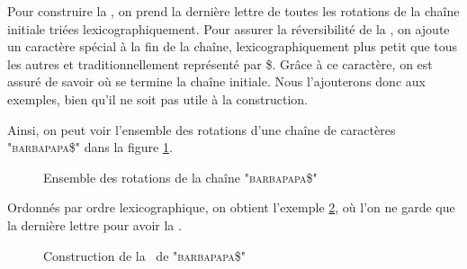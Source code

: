 Pour construire la \bwt, on prend la dernière lettre de toutes les rotations de la chaîne initiale triées lexicographiquement.
Pour assurer la réversibilité de la \bwt, on ajoute un caractère spécial à la fin de la chaîne, lexicographiquement plus petit que tous les autres et traditionnellement représenté par \$. Grâce à ce caractère, on est assuré de savoir où se termine la chaîne initiale. Nous l'ajouterons donc aux exemples, bien qu'il ne soit pas utile à la construction.

Ainsi, on peut voir l'ensemble des rotations d'une chaîne de caractères "\textsc{barbapapa\$}" dans la figure \ref{rotations}.

\begin{figure}[h!]
\caption{Ensemble des rotations de la chaîne "\textsc{barbapapa\$}"}
\label{rotations}
\end{figure}

Ordonnés par ordre lexicographique, on obtient l'exemple \ref{bwt}, où l'on ne garde que la dernière lettre pour avoir la \bwt.
\begin{figure}[h!]
\caption{Construction de la \bwt\ de "\textsc{barbapapa\$}"}
\label{bwt}
\end{figure}

